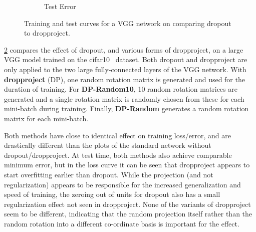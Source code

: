 \documentclass[thesis]{subfiles}
\begin{document}
\begin{figure}[tbp]
\begin{subfigure}[b]{\linewidth}
\caption{ Test Error}
\label{fig:cifar_dropproject_test_acc}
\end{subfigure}
\caption[Dropout \vs dropproject for VGG/]{Training and test curves for a VGG network on  comparing dropout to dropproject.}
\label{fig:cifar_dropproject}
\end{figure}

\cref{fig:cifar_dropproject} compares the effect of dropout, and various forms of dropproject, on a large VGG model trained on the \gls{cifar10}~\citep{CIFAR10} dataset. Both dropout and dropproject are only applied to the two large fully-connected layers of the VGG network. With \textbf{dropproject} (DP), one random rotation matrix is generated and used for the duration of training. For \textbf{DP-Random10}, 10 random rotation matrices are generated and a single rotation matrix is randomly chosen from these for each mini-batch during training. Finally, \textbf{DP-Random} generates a random rotation matrix for each mini-batch.

Both methods have close to identical effect on training loss/error, and are drastically different than the plots of the standard network without dropout/dropproject. At test time, both methods also achieve comparable minimum error, but in the loss curve it can be seen that dropproject appears to start overfitting earlier than dropout. While the projection (and not regularization) appears to be responsible for the increased generalization and speed of training, the zeroing out of units for dropout also has a small regularization effect not seen in dropproject. None of the variants of dropproject seem to be different, indicating that the random projection itself rather than the random rotation into a different co-ordinate basis is important for the effect.
\end{document}
